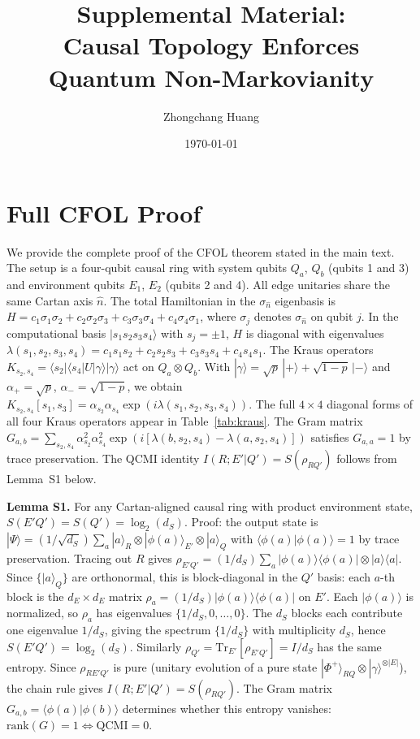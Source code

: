 \documentclass[aps,prl,superscriptaddress,nofootinbib]{revtex4-2}
\begin{document}
\title{Supplemental Material:\\ Causal Topology Enforces Quantum Non-Markovianity}
\author{Zhongchang Huang}
\date{\today}
\maketitle



\section{Full CFOL Proof}


We provide the complete proof of the CFOL theorem stated in the main text. The setup is a four-qubit causal ring with system qubits $Q_a$, $Q_b$ (qubits 1 and 3) and environment qubits $E_1$, $E_2$ (qubits 2 and 4). All edge unitaries share the same Cartan axis $\hat{n}$. The total Hamiltonian in the $\sigma_{\hat{n}}$ eigenbasis is $H = c_1\sigma_1\sigma_2 + c_2\sigma_2\sigma_3 + c_3\sigma_3\sigma_4 + c_4\sigma_4\sigma_1$, where $\sigma_j$ denotes $\sigma_{\hat{n}}$ on qubit $j$. In the computational basis $|s_1 s_2 s_3 s_4\rangle$ with $s_j = \pm1$, $H$ is diagonal with eigenvalues $\lambda(s_1,s_2,s_3,s_4) = c_1 s_1 s_2 + c_2 s_2 s_3 + c_3 s_3 s_4 + c_4 s_4 s_1$. The Kraus operators $K_{s_2,s_4} = \langle s_2|\langle s_4| U |\gamma\rangle|\gamma\rangle$ act on $Q_a\otimes Q_b$. With $|\gamma\rangle = \sqrt{p}\,|+\rangle + \sqrt{1-p}\,|-\rangle$ and $\alpha_+ = \sqrt{p}$, $\alpha_- = \sqrt{1-p}$, we obtain $K_{s_2,s_4}[s_1,s_3] = \alpha_{s_2}\alpha_{s_4} \exp(i\lambda(s_1,s_2,s_3,s_4))$. The full $4\times4$ diagonal forms of all four Kraus operators appear in Table~\ref{tab:kraus}. The Gram matrix $G_{a,b} = \sum_{s_2,s_4} \alpha_{s_2}^2\alpha_{s_4}^2 \exp(i[\lambda(b,s_2,s_4) - \lambda(a,s_2,s_4)])$ satisfies $G_{a,a} = 1$ by trace preservation. The QCMI identity $I(R;E'|Q') = S(\rho_{RQ'})$ follows from Lemma~S1 below.


\textbf{Lemma S1.} For any Cartan-aligned causal ring with product environment state, $S(E'Q') = S(Q') = \log_2(d_S)$. Proof: the output state is $|\Psi\rangle = (1/\sqrt{d_S}) \sum_a |a\rangle_R \otimes |\phi(a)\rangle_{E'} \otimes |a\rangle_Q$ with $\langle\phi(a)|\phi(a)\rangle = 1$ by trace preservation. Tracing out $R$ gives $\rho_{E'Q'} = (1/d_S) \sum_a |\phi(a)\rangle\langle\phi(a)| \otimes |a\rangle\langle a|$. Since $\{|a\rangle_Q\}$ are orthonormal, this is block-diagonal in the $Q'$ basis: each $a$-th block is the $d_E\times d_E$ matrix $\rho_a = (1/d_S)|\phi(a)\rangle\langle\phi(a)|$ on $E'$. Each $|\phi(a)\rangle$ is normalized, so $\rho_a$ has eigenvalues $\{1/d_S, 0, \ldots, 0\}$. The $d_S$ blocks each contribute one eigenvalue $1/d_S$, giving the spectrum $\{1/d_S\}$ with multiplicity $d_S$, hence $S(E'Q') = \log_2(d_S)$. Similarly $\rho_{Q'} = \mathrm{Tr}_{E'}[\rho_{E'Q'}] = I/d_S$ has the same entropy. Since $\rho_{RE'Q'}$ is pure (unitary evolution of a pure state $|\Phi^+\rangle_{RQ}\otimes|\gamma\rangle^{\otimes|E|}$), the chain rule gives $I(R;E'|Q') = S(\rho_{RQ'})$. The Gram matrix $G_{a,b} = \langle\phi(a)|\phi(b)\rangle$ determines whether this entropy vanishes: $\mathrm{rank}(G)=1 \iff \mathrm{QCMI}=0$.
\end{document}

